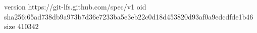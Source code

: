 version https://git-lfs.github.com/spec/v1
oid sha256:65ad738db9a973b7d36e7233ba5e3eb22c0d18d453820d93af0a9edcdfde1b46
size 410342
